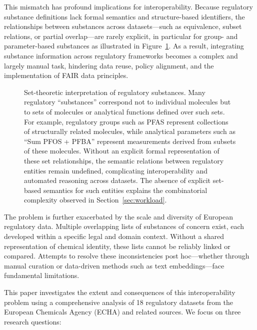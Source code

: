 This mismatch has profound implications for interoperability. Because regulatory substance definitions lack formal semantics and structure-based identifiers, the relationships between substances across datasets—such as equivalence, subset relations, or partial overlap—are rarely explicit, in particular for group- and parameter-based substances as illustrated in Figure~\ref{fig:regulatory_groups}. As a result, integrating substance information across regulatory frameworks becomes a complex and largely manual task, hindering data reuse, policy alignment, and the implementation of FAIR data principles.

\begin{figure}[!ht]
	\centering                                                             
	\caption{Set-theoretic interpretation of regulatory substances.
		Many regulatory “substances” correspond not to individual molecules but to sets of molecules or analytical functions defined over such sets. For example, regulatory groups such as PFAS represent collections of structurally related molecules, while analytical parameters such as “Sum PFOS + PFBA” represent measurements derived from subsets of these molecules. Without an explicit formal representation of these set relationships, the semantic relations between regulatory entities remain undefined, complicating interoperability and automated reasoning across datasets.
		The absence of explicit set-based semantics for such entities explains the combinatorial complexity observed in Section~\ref{sec:workload}.} \label{fig:regulatory_groups}
\end{figure}  

The problem is further exacerbated by the scale and diversity of European regulatory data. Multiple overlapping lists of substances of concern exist, each developed within a specific legal and domain context. Without a shared representation of chemical identity, these lists cannot be reliably linked or compared. Attempts to resolve these inconsistencies post hoc—whether through manual curation or data-driven methods such as text embeddings—face fundamental limitations.

This paper investigates the extent and consequences of this interoperability problem using a comprehensive analysis of 18 regulatory datasets from the European Chemicals Agency (ECHA) and related sources. We focus on three research questions:

